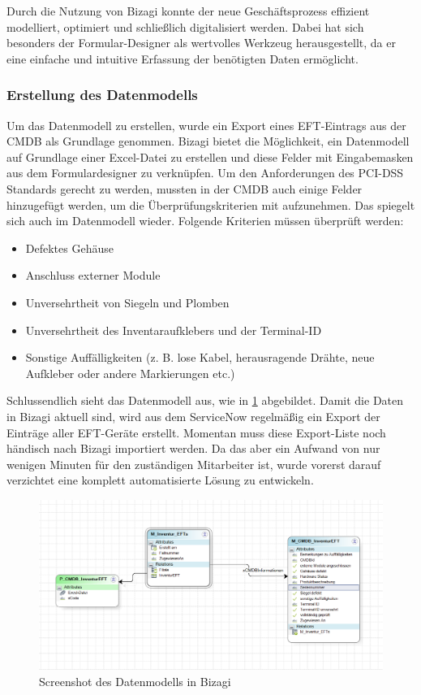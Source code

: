 \documentclass[12pt, a4paper]{article}
\begin{document}
Durch die Nutzung von Bizagi konnte der neue Geschäftsprozess effizient modelliert, optimiert und schließlich digitalisiert werden. Dabei hat sich besonders der 
Formular-Designer als wertvolles Werkzeug herausgestellt, da er eine einfache und intuitive Erfassung der benötigten Daten ermöglicht.

\subsubsection{Erstellung des Datenmodells}
Um das Datenmodell zu erstellen, wurde ein Export eines EFT-Eintrags aus der CMDB als Grundlage genommen. Bizagi bietet die Möglichkeit, ein Datenmodell auf Grundlage einer 
Excel-Datei zu erstellen und diese Felder mit Eingabemasken aus dem Formulardesigner zu verknüpfen. Um den Anforderungen des PCI-DSS Standards gerecht zu werden, mussten in der
CMDB auch einige Felder hinzugefügt werden, um die Überprüfungskriterien mit aufzunehmen. Das spiegelt sich auch im Datenmodell wieder.
Folgende Kriterien müssen überprüft  werden:

\begin{itemize}
    \item Defektes Gehäuse
    \item Anschluss externer Module
    \item Unversehrtheit von Siegeln und Plomben
    \item Unversehrtheit des Inventaraufklebers und der Terminal-ID
    \item Sonstige Auffälligkeiten (z. B. lose Kabel, herausragende Drähte, neue Aufkleber oder andere Markierungen etc.)
\end{itemize}

\cite{Würz_Gebauer_2022}

Schlussendlich sieht das Datenmodell aus, wie in \ref{fig:data-model} abgebildet.
Damit die Daten in Bizagi aktuell sind, wird aus dem ServiceNow regelmäßig ein Export der Einträge aller EFT-Geräte erstellt. Momentan muss diese Export-Liste noch händisch
nach Bizagi importiert werden. Da das aber ein Aufwand von nur wenigen Minuten für den zuständigen Mitarbeiter ist, wurde vorerst darauf verzichtet eine komplett automatisierte 
Lösung zu entwickeln.

\begin{figure}
    \centering
    \includegraphics[width=\textwidth]{images/data-model.png}
    \caption{Screenshot des Datenmodells in Bizagi}
    \label{fig:data-model}
\end{figure}
\newpage
\end{document}
